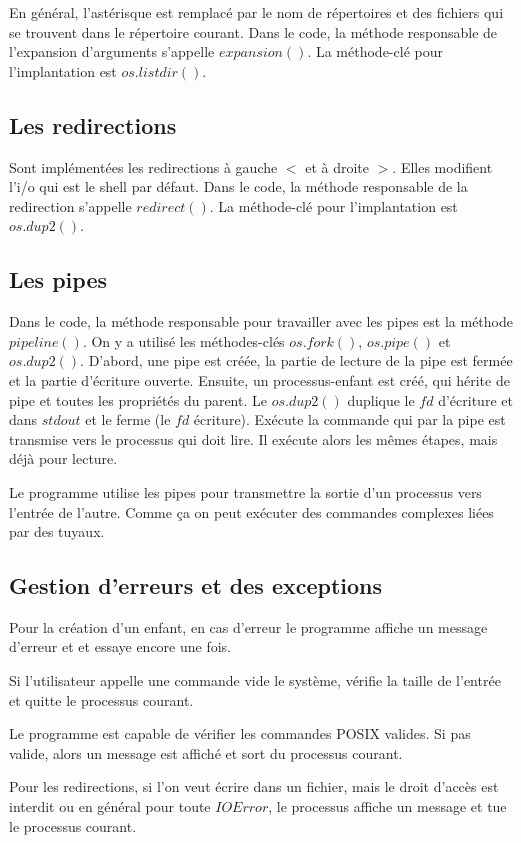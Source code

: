 \documentclass{article}
\begin{document}
En général, l’astérisque est remplacé par le nom de répertoires et des fichiers qui se trouvent dans le répertoire courant. Dans le code, la méthode responsable de l’expansion d’arguments s’appelle $expansion()$. La méthode-clé pour l’implantation est $os.listdir()$.
\subsection*{Les redirections}
Sont implémentées les redirections à gauche $<$ et à droite $>$. Elles modifient l'i/o qui est le shell par défaut. Dans le code, la méthode responsable de la redirection s’appelle $redirect()$. La méthode-clé pour l’implantation est $os.dup2()$.
\subsection*{Les pipes}
Dans le code, la méthode responsable pour travailler avec les pipes est la méthode $pipeline()$. On y a utilisé les méthodes-clés $os.fork()$, $os.pipe()$ et $os.dup2()$. D’abord, une pipe est créée, la partie de lecture de la pipe est fermée et la partie d’écriture ouverte. Ensuite, un processus-enfant est créé, qui hérite de pipe et toutes les propriétés du parent. Le $os.dup2()$ duplique le $fd$ d’écriture et dans $stdout$ et le ferme (le $fd$ écriture). Exécute la commande qui par la pipe est transmise vers le processus qui doit lire. Il exécute alors les mêmes étapes, mais déjà pour lecture.

Le programme utilise les pipes pour transmettre la sortie d’un processus vers l’entrée de l’autre. Comme ça on peut exécuter des commandes complexes liées par des tuyaux.
\subsection*{Gestion d’erreurs et des exceptions}
Pour la création d’un enfant, en cas d’erreur le programme affiche un message d’erreur et et essaye encore une fois.

Si l’utilisateur appelle une commande vide le système, vérifie la taille de l’entrée et quitte le processus courant.

Le programme est capable de vérifier les commandes POSIX valides. Si pas valide, alors un message est affiché et sort du processus courant.

Pour les redirections, si l’on veut écrire dans un fichier, mais le droit d’accès est interdit ou en général pour toute $IOError$, le processus affiche un message et tue le processus courant. 
\end{document}
